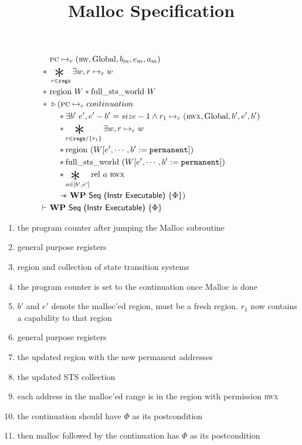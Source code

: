 \documentclass{article}
\title{Malloc Specification}
\newcommand{\sep}{-\kern-.6em\raisebox{-.659ex}{*}\ }
\newcommand{\bigsep}{\mathop{\scalebox{2.5}{\raisebox{-0.4ex}{$*$}}}}%
\begin{document}
\maketitle

\begin{align}
	&\textsc{pc} \mapsto_r ({\small \textsc{rw}},\text{Global},b_m,e_m,a_m) \\
	*~&\bigsep_{r \in \texttt{regs}} \exists w, r \mapsto_r w \\
	*~&\text{region } W * \text{full\_sts\_world } W \\
    *~&\triangleright (\textsc{pc} \mapsto_r continuation \\
    						  &\hspace{1em}* \exists b'~e', e' - b' = size -1 \wedge r_1 \mapsto_r ({\small \textsc{rwx}},\text{Global},b',e',b') \\
    						  &\hspace{1em}* \bigsep_{r \in  \texttt{regs}/\{r_1\}} \exists w, r \mapsto_r w\\
    						  &\hspace{1em}* \text{region }(W[e',\cdots,b':=\texttt{permanent}]) \\
    						  &\hspace{1em}* \text{full\_sts\_world  }(W[e',\cdots,b':=\texttt{permanent}])\\
    						  &\hspace{1em}* \bigsep_{a \in [b',e']}\text{rel }a~{\small \textsc{rwx}} \\
    						  &\hspace{1em}\sep \textbf{WP}~\textsf{Seq (Instr Executable)}~\{\Phi\})\\
  \vdash~&\textbf{WP}~\textsf{Seq (Instr Executable)}~\{\Phi\}
\end{align}

\begin{enumerate}[label=(\arabic*)]
	\item the program counter after jumping the Malloc subroutine
	\item general purpose registers 
	\item region and collection of state transition systems
	\item the program counter is set to the continuation once Malloc is done
	\item $b'$ and $e'$ denote the malloc'ed region, must be a fresh region. $r_1$ now contains a capability to that region
	\item general purpose registers 
	\item the updated region with the new permanent addresses
	\item the updated STS collection
	\item each address in the malloc'ed range is in the region with permission {\small \textsc{rwx}}
	\item the continuation should have $\Phi$ as its postcondition 
	\item then malloc followed by the continuation has $\Phi$ as its postcondition 
\end{enumerate}
\end{document}
